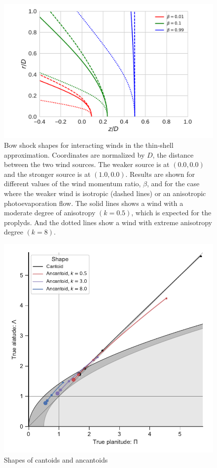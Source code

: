 \begin{figure}
\includegraphics[width=\linewidth]{figs/r-beta}
\caption{Bow shock shapes for interacting winds in the thin-shell
  approximation. Coordinates are normalized by $D$, the distance
  between the two wind sources.  The weaker source is at \((0.0, 0.0)\)
  and the stronger source is at \((1.0, 0.0)\).  Results are shown for
  different values of the wind momentum ratio, \(\beta\), and for the
  case where the weaker wind is isotropic (dashed lines) or an
  anisotropic photoevaporation flow. The solid lines shows a wind with a
  moderate degree of anisotropy $(k=0.5)$, which is expected for the proplyds.
  And the dotted lines show a wind with extreme anisotropy degree $(k=8)$.}
\label{fig:r-beta}
\end{figure}


\begin{figure}
  \centering
  \includegraphics{figs/ancantoid-Pi-lambda-true}
  \caption{Shapes of cantoids and ancantoids}
  \label{fig:ancantoid-Pi-lambda-true}
\end{figure}

